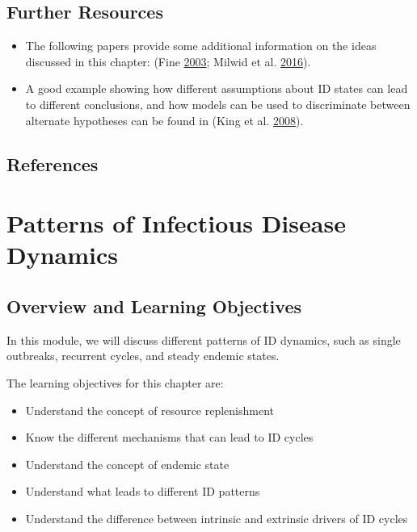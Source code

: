 \documentclass[]{article}
\providecommand{\tightlist}{%
  \setlength{\itemsep}{0pt}\setlength{\parskip}{0pt}}
\theoremstyle{definition}
\theoremstyle{definition}
\theoremstyle{definition}
\theoremstyle{remark}
\begin{document}
\subsection{Further Resources}\label{further-resources-1}

\begin{itemize}
\tightlist
\item
  The following papers provide some additional information on the ideas
  discussed in this chapter: (Fine \protect\hyperlink{ref-fine03}{2003};
  Milwid et al. \protect\hyperlink{ref-milwid16}{2016}).
\item
  A good example showing how different assumptions about ID states can
  lead to different conclusions, and how models can be used to
  discriminate between alternate hypotheses can be found in (King et al.
  \protect\hyperlink{ref-king08}{2008}).
\end{itemize}

\subsection{References}\label{references-2}

\section{Patterns of Infectious Disease
Dynamics}\label{patterns-of-infectious-disease-dynamics}

\subsection{Overview and Learning
Objectives}\label{overview-and-learning-objectives-2}

In this module, we will discuss different patterns of ID dynamics, such
as single outbreaks, recurrent cycles, and steady endemic states.

The learning objectives for this chapter are:

\begin{itemize}
\tightlist
\item
  Understand the concept of resource replenishment
\item
  Know the different mechanisms that can lead to ID cycles
\item
  Understand the concept of endemic state
\item
  Understand what leads to different ID patterns
\item
  Understand the difference between intrinsic and extrinsic drivers of
  ID cycles
\end{itemize}
\end{document}
